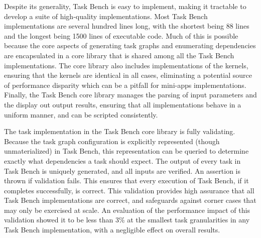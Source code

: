 

Despite its generality, Task Bench is easy to implement, making it
tractable to develop a suite of high-quality implementations. Most
Task Bench implementations are several hundred lines long, with the
shortest being 88 lines and the longest being 1500 lines of executable
code. Much of this is possible because the core aspects of generating
task graphs and enumerating dependencies are encapsulated in a core
library that is shared among all the Task Bench implementations. The
core library also includes implementations of the kernels, ensuring
that the kernels are identical in all cases, eliminating a potential
source of performance disparity which can be a pitfall for mini-apps
implementations. Finally, the Task Bench core library manages the
parsing of input parameters and the display out output results,
ensuring that all implementations behave in a uniform manner, and can
be scripted consistently.

The task implementation in the Task Bench core library is fully
validating. Because the task graph configuration is explicitly
represented (though unmaterialized) in Task Bench, this representation
can be queried to determine exactly what dependencies a task should
expect. The output of every task in Task Bench is uniquely generated,
and all inputs are verified. An assertion is thrown if validation
fails. This ensures that every execution of Task Bench, if it
completes successfully, is correct. This validation provides high
assurance that all Task Bench implementations are correct, and
safeguards against corner cases that may only be exercised at
scale. An evaluation of the performance impact of
this validation showed it to be less than 3\% at the smallest task
granularities in any Task Bench implementation, with a negligible
effect on overall results.
